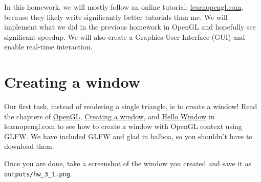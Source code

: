 In this homework, we will mostly follow an online tutorial: \href{https://learnopengl.com/}{learnopengl.com}, because they likely write significantly better tutorials than me. We will implement what we did in the previous homework in OpenGL and hopefully see significant speedup. We will also create a Graphics User Interface (GUI) and enable real-time interaction.

\section{Creating a window}

Our first task, instead of rendering a single triangle, is to create a window! Read the chapters of \href{https://learnopengl.com/Getting-started/OpenGL}{OpenGL}, \href{https://learnopengl.com/Getting-started/Creating-a-window}{Creating a window}, and \href{https://learnopengl.com/Getting-started/Hello-Window}{Hello Window} in learnopengl.com to see how to create a window with OpenGL context using GLFW. We have included GLFW and glad in balboa, so you shouldn't have to download them. 

Once you are done, take a screenshot of the window you created and save it as \lstinline{outputs/hw_3_1.png}.

%
%


